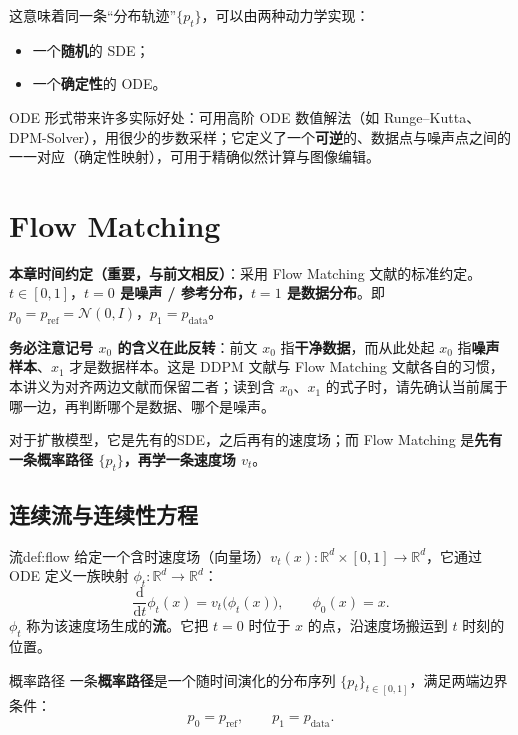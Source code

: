 这意味着同一条“分布轨迹”$\{p_t\}$，可以由两种动力学实现：
\begin{itemize}
\item 一个\textbf{随机}的 SDE；
\item 一个\textbf{确定性}的 ODE。
\end{itemize}

ODE 形式带来许多实际好处：可用高阶 ODE 数值解法（如 Runge–Kutta、DPM-Solver），用很少的步数采样；它定义了一个\textbf{可逆}的、数据点与噪声点之间的一一对应（确定性映射），可用于精确似然计算与图像编辑。

\section{Flow Matching}

\begin{framed}{}
\textbf{本章时间约定（重要，与前文相反）}：采用 Flow Matching 文献的标准约定。$t\in[0,1]$，\textbf{$t=0$ 是噪声 / 参考分布，$t=1$ 是数据分布}。即 $p_0 = p_{\text{ref}} = \mathcal N(0,I)$，$p_1 = p_{\text{data}}$。

\textbf{务必注意记号 $x_0$ 的含义在此反转}：前文 $x_0$ 指\textbf{干净数据}，而从此处起 $x_0$ 指\textbf{噪声样本}、$x_1$ 才是数据样本。这是 DDPM 文献与 Flow Matching 文献各自的习惯，本讲义为对齐两边文献而保留二者；读到含 $x_0$、$x_1$ 的式子时，请先确认当前属于哪一边，再判断哪个是数据、哪个是噪声。
\end{framed}

对于扩散模型，它是先有的SDE，之后再有的速度场；而 Flow Matching 是\textbf{先有一条概率路径 $\{p_t\}$，再学一条速度场 $v_t$}。

\subsection{连续流与连续性方程}

\begin{definition}{流}{def:flow}
    给定一个含时速度场（向量场）$v_t(x): \mathbb{R}^d\times[0,1]\to\mathbb{R}^d$，它通过 ODE 定义一族映射 $\phi_t:\mathbb{R}^d\to\mathbb{R}^d$：
\begin{equation}\label{eq:flow_ode}
\frac{\mathrm{d}}{\mathrm{d}t}\phi_t(x) = v_t\big(\phi_t(x)\big), \qquad \phi_0(x) = x.
\tag{4.1}
\end{equation}
$\phi_t$ 称为该速度场生成的\textbf{流}。它把 $t=0$ 时位于 $x$ 的点，沿速度场搬运到 $t$ 时刻的位置。
\end{definition}

\begin{definition}{概率路径}{}
    一条\textbf{概率路径}是一个随时间演化的分布序列 $\{p_t\}_{t\in[0,1]}$，满足两端边界条件：
\begin{equation}\label{eq:probability_path_boundary}
p_0 = p_{\text{ref}},\qquad p_1 = p_{\text{data}}.
\end{equation}
\end{definition}

